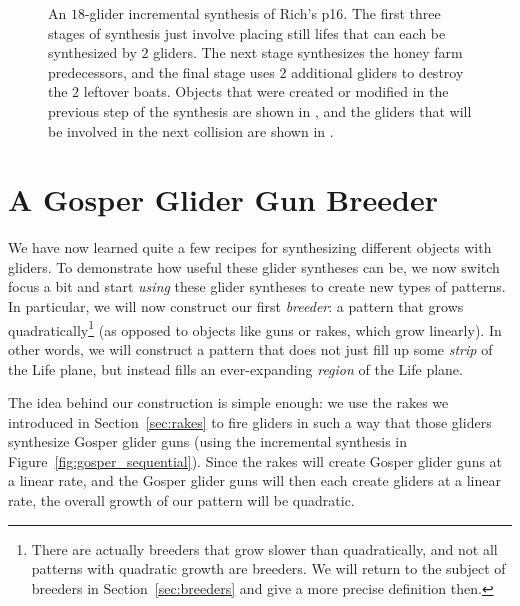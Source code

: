 \begin{figure}[!ht]
	\centering
	
	\caption{An $18$-glider incremental synthesis of Rich's p16. The first three stages of synthesis just involve placing still lifes that can each be synthesized by $2$ gliders. The next stage synthesizes the honey farm predecessors, and the final stage uses $2$ additional gliders to destroy the $2$ leftover boats. Objects that were created or modified in the previous step of the synthesis are shown in , and the gliders that will be involved in the next collision are shown in .}\label{fig:richs_p16_synthesis}
\end{figure}


\section{A Gosper Glider Gun Breeder}\label{sec:gosper_breeder}

We have now learned quite a few recipes for synthesizing different objects with gliders. To demonstrate how useful these glider syntheses can be, we now switch focus a bit and start \emph{using} these glider syntheses to create new types of patterns. In particular, we will now construct our first \emph{breeder}: a pattern that grows quadratically\footnote{There are actually breeders that grow slower than quadratically, and not all patterns with quadratic growth are breeders. We will return to the subject of breeders in Section~\ref{sec:breeders} and give a more precise definition then.} (as opposed to objects like guns or rakes, which grow linearly). In other words, we will construct a pattern that does not just fill up some \emph{strip} of the Life plane, but instead fills an ever-expanding \emph{region} of the Life plane.

The idea behind our construction is simple enough: we use the rakes we introduced in Section~\ref{sec:rakes} to fire gliders in such a way that those gliders synthesize Gosper glider guns (using the incremental synthesis in Figure~\ref{fig:gosper_sequential}). Since the rakes will create Gosper glider guns at a linear rate, and the Gosper glider guns will then each create gliders at a linear rate, the overall growth of our pattern will be quadratic.

